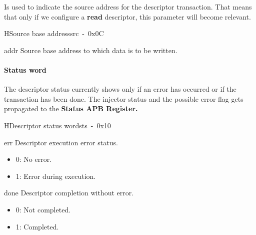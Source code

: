 Is used to indicate the source address for the descriptor transaction. That means that only if we configure a \textbf{read} descriptor, this parameter will become relevant.\\
\vspace{0.3cm}
\begin{register}{H}{Source base address}{src~-~0x0C}
    \label{desc_src}%
    \regnewline%
    \begin{regdesc}\begin{reglist}
        \item [addr]Source base address to which data is to be written.
 \end{reglist}\end{regdesc}\end{register}

\newpage
\paragraph{Status word} %
The descriptor status currently shows only if an error has occurred or if the transaction has been done. The injector status and the possible error flag gets propagated to the \textbf{Status APB Register.}\\

\begin{register}{H}{Descriptor status word}{sts~-~0x10}
    \label{desc_sts}%
    \regnewline%
    \begin{regdesc}\begin{reglist}
        \item [err]Descriptor execution error status.
		\begin{itemize}
  		\item 0: No error.
  		\item 1: Error during execution.
		\end{itemize}
        \item [done]Descriptor completion without error.
		\begin{itemize}
  		\item 0: Not completed.
  		\item 1: Completed.
		\end{itemize}
 \end{reglist}\end{regdesc}\end{register}

